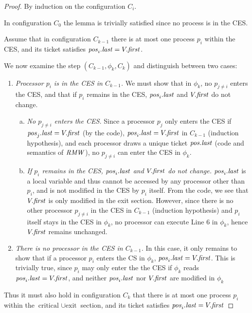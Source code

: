 \begin{proof}
By induction on the configuration $C_i$.

In configuration $C_0$ the lemma is trivially satisfied since no process is in
the CES.

Assume that in configuration $C_{k-1}$ there is at most one process
$p_i$ within the CES, and its ticket
satisfies $\mathit{pos}_i.\mathit{last} = V.\mathit{first}$.

We now examine the step $(C_{k-1}, \phi_k, C_k)$ and distinguish between two cases: 
\begin{enumerate}
\item \emph{Processor $p_i$ is in the CES in $C_{k-1}$.} We must show that in $\phi_k$,
      no $p_{j \neq i}$ enters the CES, and that if $p_i$
      remains in the CES, $\mathit{pos}_i.\mathit{last}$ and $V.\mathit{first}$ do not change.
      \begin{enumerate}[a)]
      \item \emph{No $p_{j \neq i}$ enters the CES.} 
            Since a processor $p_j$ only enters the CES
            if $\mathit{pos}_j.\mathit{last} = V.\mathit{first}$ (by the code),
            $\mathit{pos}_i.\mathit{last} = V.\mathit{first}$ in $C_{k-1}$ (induction hypothesis),
            and each processor draws a unique ticket $\mathit{pos}.\mathit{last}$ (code and
            semantics of $\mathit{RMW}$), no $p_{j \neq i}$ can enter the CES in $\phi_k$.
      \item \emph{If $p_i$ remains in the CES, $\mathit{pos}_i.\mathit{last}$ and $V.\mathit{first}$ 
            do not change.} $\mathit{pos}_i.\mathit{last}$ is a local variable and thus cannot
            be accessed by any processor other than $p_i$, and is not modified 
            in the CES by $p_i$ itself. From the code, we see that $V.\mathit{first}$
            is only modified in the exit section. However, since there is no
            other processor $p_{j \neq i}$ in the CES in $C_{k-1}$
            (induction hypothesis) and $p_i$ itself stays in the CES in $\phi_k$,
            no processor can execute Line 6 in $\phi_k$, hence $V.\mathit{first}$
            remains unchanged.            
      \end{enumerate}
\item \emph{There is no processor in the CES in $C_{k-1}$.}
      In this case, it only remains to show that if a processor $p_i$ enters
      the CS in $\phi_k$, $\mathit{pos}_i.\mathit{last} = V.\mathit{first}$. This is trivially true,
      since $p_i$ may only enter the the CES if $\phi_k$ reads
      $\mathit{pos}_i.\mathit{last} = V.\mathit{first}$, and neither $\mathit{pos}_i.\mathit{last}$ nor $V.\mathit{first}$
      are modified in $\phi_k$
\end{enumerate}
Thus it must also hold in configuration $C_k$ that there is at most one process
$p_i$ within the $\text{critical } \cup \text{exit}$ section, and its ticket
satisfies $\mathit{pos}_i.\mathit{last} = V.\mathit{first}$
\end{proof}



